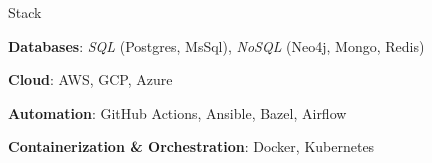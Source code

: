 \documentclass[]{mcdowellcv}
\begin{document}
    \begin{cvsection}{Stack}
        \begin{cvsubsection}{}{}{}
            \begin{minipage}[t]{0.48\textwidth}
                \small
                \textbf{Databases}: \textit{SQL} (Postgres, MsSql), \textit{NoSQL} (Neo4j, Mongo, Redis)

                \vspace{0.15em}

                \textbf{Cloud}: AWS, GCP, Azure
            \end{minipage}
            \hfill
            \begin{minipage}[t]{0.48\textwidth}
                \raggedleft
                \small
                \textbf{Automation}: GitHub Actions, Ansible, Bazel, Airflow

                \vspace{0.15em}

                \textbf{Containerization \& Orchestration}: Docker, Kubernetes
            \end{minipage}
        \end{cvsubsection}
    \end{cvsection}
\end{document}
